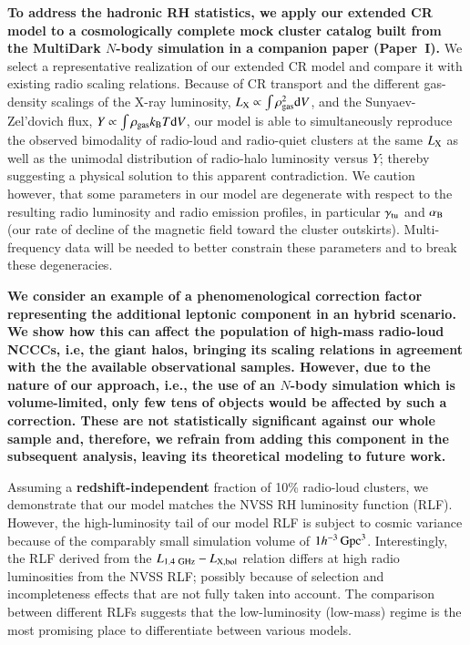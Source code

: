 \documentclass[useAMS,usenatbib]{mn2e}
\newcommand{\dd}{\mathrm{d}}
\begin{document}
{\bf To address the hadronic RH statistics, we apply our extended CR model 
to a cosmologically complete mock cluster catalog built from the MultiDark
$N$-body simulation in a companion paper (Paper~I).} We select a representative 
realization of our extended CR model and compare it with existing radio scaling relations. 
Because of CR transport and the different gas-density scalings of the X-ray luminosity,
$L_{\rmn{X}}\propto\int \rho_\rmn{gas}^2 \dd V$, and the Sunyaev-Zel'dovich
flux, $Y\propto\int \rho_{\rmn{gas}} k_{\rmn{B}} T \dd V$, our model is able to
simultaneously reproduce the observed bimodality of radio-loud and radio-quiet
clusters at the same $L_{{\mathrm{X}}}$ as well as the unimodal distribution of
radio-halo luminosity versus $Y$; thereby suggesting a physical solution to this
apparent contradiction. We caution however, that some parameters in our model
are degenerate with respect to the resulting radio luminosity and radio emission
profiles, in particular $\gamma_{{\mathrm{tu}}}$ and $ \alpha_{{\mathrm{B}}}$ (our rate of decline
of the magnetic field toward the cluster outskirts). Multi-frequency data will
be needed to better constrain these parameters and to break these degeneracies.

{\bf We consider an example of a phenomenological correction factor representing the 
additional leptonic component in an hybrid scenario. We show how this can affect the 
population of high-mass radio-loud NCCCs, i.e, the giant halos, bringing its scaling relations 
in agreement with the the available observational samples. However, due to the nature 
of our approach, i.e., the use of an $N$-body simulation which is volume-limited, only few 
tens of objects would be affected by such a correction. These are not statistically significant 
against our whole sample and, therefore, we refrain from adding this component in the 
subsequent analysis, leaving its theoretical modeling to future work.}

Assuming a {\bf redshift-independent} fraction of 10\% radio-loud clusters, we demonstrate that our 
model matches the NVSS RH luminosity function (RLF). However, the
high-luminosity tail of our model RLF is subject to cosmic variance because of
the comparably small simulation volume of $1
h^{-3}\,{\mathrm{Gpc}}^3$. Interestingly, the RLF derived from the
$L_{1.4~{\mathrm{GHz}}}-L_{{\mathrm{X,bol}}}$ relation differs at high radio luminosities
from the NVSS RLF; possibly because of selection and incompleteness effects that
are not fully taken into account. The comparison between different RLFs suggests
that the low-luminosity (low-mass) regime is the most promising place to
differentiate between various models.
\end{document}
